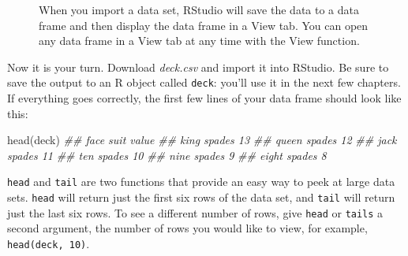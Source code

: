 \documentclass[
  letterpaper,
  DIV=11,
  numbers=noendperiod]{scrbook}
\makeatletter
\newenvironment{Shaded}{\begin{snugshade}}{\end{snugshade}}
\newcommand{\DocumentationTok}[1]{\textcolor[rgb]{0.37,0.37,0.37}{\textit{#1}}}
\newcommand{\FunctionTok}[1]{\textcolor[rgb]{0.28,0.35,0.67}{#1}}
\newcommand{\NormalTok}[1]{\textcolor[rgb]{0.00,0.23,0.31}{#1}}
\newcommand*\pandocbounded[1]{%
  \sbox\pandoc@box{#1}%
  \Gscale@div\@tempa{\textheight}{\dimexpr\ht\pandoc@box+\dp\pandoc@box\relax}%
  \Gscale@div\@tempb{\linewidth}{\wd\pandoc@box}%
  \ifdim\@tempb\p@<\@tempa\p@\let\@tempa\@tempb\fi%
  \ifdim\@tempa\p@<\p@\scalebox{\@tempa}{\usebox\pandoc@box}%
  \else\usebox{\pandoc@box}%
  \fi%
}
\makeatother
\begin{document}
\begin{figure}

\centering{

\pandocbounded{\texttt{[image: images/hopr\_0305.png]}}

}

\caption{\label{fig-view}When you import a data set, RStudio will save
the data to a data frame and then display the data frame in a View tab.
You can open any data frame in a View tab at any time with the View
function.}

\end{figure}%

Now it is your turn. Download \emph{deck.csv} and import it into
RStudio. Be sure to save the output to an R object called \texttt{deck}:
you'll use it in the next few chapters. If everything goes correctly,
the first few lines of your data frame should look like this:

\begin{Shaded}
\begin{Highlighting}[]
\FunctionTok{head}\NormalTok{(deck)}
\DocumentationTok{\#\#  face   suit value}
\DocumentationTok{\#\#  king spades    13}
\DocumentationTok{\#\# queen spades    12}
\DocumentationTok{\#\#  jack spades    11}
\DocumentationTok{\#\#   ten spades    10}
\DocumentationTok{\#\#  nine spades     9}
\DocumentationTok{\#\# eight spades     8}
\end{Highlighting}
\end{Shaded}

\begin{tcolorbox}[enhanced jigsaw, breakable, colback=white, colbacktitle=quarto-callout-note-color!10!white, arc=.35mm, bottomrule=.15mm, coltitle=black, left=2mm, rightrule=.15mm, colframe=quarto-callout-note-color-frame, leftrule=.75mm, opacitybacktitle=0.6, bottomtitle=1mm, toptitle=1mm, titlerule=0mm, opacityback=0, title=\textcolor{quarto-callout-note-color}{\faInfo}\hspace{0.5em}{Note}, toprule=.15mm]

\texttt{head} and \texttt{tail} are two functions that provide an easy
way to peek at large data sets. \texttt{head} will return just the first
six rows of the data set, and \texttt{tail} will return just the last
six rows. To see a different number of rows, give \texttt{head} or
\texttt{tails} a second argument, the number of rows you would like to
view, for example, \texttt{head(deck,\ 10)}.

\end{tcolorbox}
\end{document}
